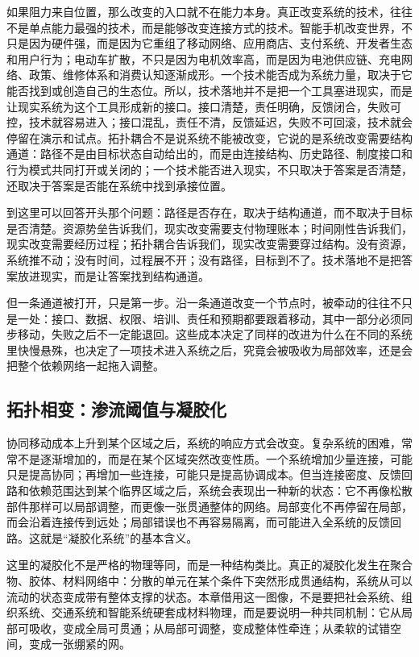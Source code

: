 
如果阻力来自位置，那么改变的入口就不在能力本身。真正改变系统的技术，往往不是单点能力最强的技术，而是能够改变连接方式的技术。智能手机改变世界，不只是因为硬件强，而是因为它重组了移动网络、应用商店、支付系统、开发者生态和用户行为；电动车扩散，不只是因为电机效率高，而是因为电池供应链、充电网络、政策、维修体系和消费认知逐渐成形。一个技术能否成为系统力量，取决于它能否找到或创造自己的生态位。所以，技术落地并不是把一个工具塞进现实，而是让现实系统为这个工具形成新的接口。接口清楚，责任明确，反馈闭合，失败可控，技术就容易进入；接口混乱，责任不清，反馈延迟，失败不可回滚，技术就会停留在演示和试点。拓扑耦合不是说系统不能被改变，它说的是系统改变需要结构通道：路径不是由目标状态自动给出的，而是由连接结构、历史路径、制度接口和行为模式共同打开或关闭的；一个技术能否进入现实，不只取决于答案是否清楚，还取决于答案是否能在系统中找到承接位置。

到这里可以回答开头那个问题：路径是否存在，取决于结构通道，而不取决于目标是否清楚。资源势垒告诉我们，现实改变需要支付物理账本；时间刚性告诉我们，现实改变需要经历过程；拓扑耦合告诉我们，现实改变需要穿过结构。没有资源，系统推不动；没有时间，过程展不开；没有路径，目标到不了。技术落地不是把答案放进现实，而是让答案找到结构通道。

但一条通道被打开，只是第一步。沿一条通道改变一个节点时，被牵动的往往不只是一处：接口、数据、权限、培训、责任和预期都要跟着移动，其中一部分必须同步移动，失败之后不一定能退回。这些成本决定了同样的改进为什么在不同的系统里快慢悬殊，也决定了一项技术进入系统之后，究竟会被吸收为局部效率，还是会把整个依赖网络一起拖入调整。

\subsection{拓扑相变：渗流阈值与凝胶化}

协同移动成本上升到某个区域之后，系统的响应方式会改变。复杂系统的困难，常常不是逐渐增加的，而是在某个区域突然改变性质。一个系统增加少量连接，可能只是提高协同；再增加一些连接，可能只是提高协调成本。但当连接密度、反馈回路和依赖范围达到某个临界区域之后，系统会表现出一种新的状态：它不再像松散部件那样可以局部调整，而更像一张贯通整体的网络。局部变化不再停留在局部，而会沿着连接传到远处；局部错误也不再容易隔离，而可能进入全系统的反馈回路。这就是“凝胶化系统”的基本含义。

这里的凝胶化不是严格的物理等同，而是一种结构类比。真正的凝胶化发生在聚合物、胶体、材料网络中：分散的单元在某个条件下突然形成贯通结构，系统从可以流动的状态变成带有整体支撑的状态。本章借用这一图像，不是要把社会系统、组织系统、交通系统和智能系统硬套成材料物理，而是要说明一种共同机制：它从局部可吸收，变成全局可贯通；从局部可调整，变成整体性牵连；从柔软的试错空间，变成一张绷紧的网。

